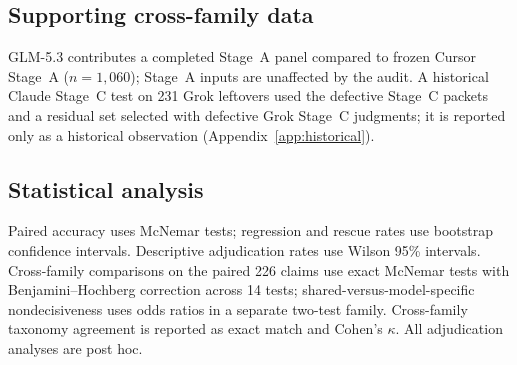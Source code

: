 \subsection{Supporting cross-family data}
\label{sec:cross-family-design}
GLM-5.3 contributes a completed Stage~A panel compared to frozen Cursor Stage~A ($n=1{,}060$); Stage~A inputs are unaffected by the audit.
A historical Claude Stage~C test on 231 Grok leftovers used the defective Stage~C packets and a residual set selected with defective Grok Stage~C judgments; it is reported only as a historical observation (Appendix~\ref{app:historical}).

\subsection{Statistical analysis}
Paired accuracy uses McNemar tests; regression and rescue rates use bootstrap confidence intervals.
Descriptive adjudication rates use Wilson 95\% intervals.
Cross-family comparisons on the paired 226 claims use exact McNemar tests with Benjamini--Hochberg correction across 14 tests; shared-versus-model-specific nondecisiveness uses odds ratios in a separate two-test family.
Cross-family taxonomy agreement is reported as exact match and Cohen's $\kappa$.
All adjudication analyses are post hoc.
